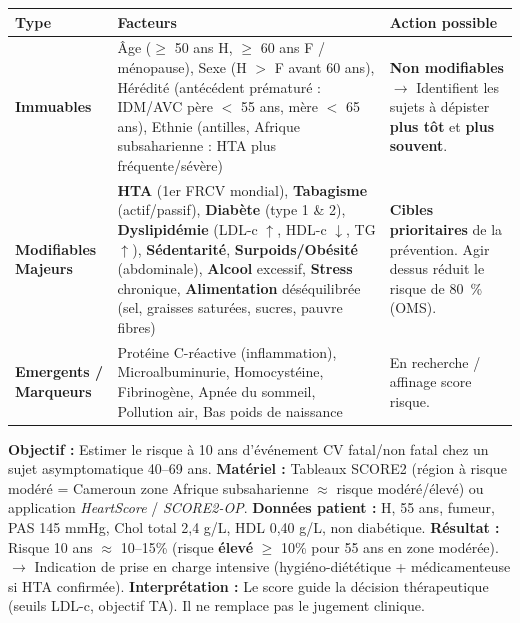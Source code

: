 \documentclass[11pt]{article}
\begin{document}
\begin{propriete}
\begin{center}
\begin{tabularx}{\linewidth}{|l|X|X|}\hline
\textbf{Type} & \textbf{Facteurs} & \textbf{Action possible} \\ \hline
\textbf{Immuables} & Âge ($\ge$ 50 ans H, $\ge$ 60 ans F / ménopause), Sexe (H $>$ F avant 60 ans), Hérédité (antécédent prématuré : IDM/AVC père $<$ 55 ans, mère $<$ 65 ans), Ethnie (antilles, Afrique subsaharienne : HTA plus fréquente/sévère) & \textbf{Non modifiables} $\rightarrow$ Identifient les sujets à dépister \textbf{plus tôt} et \textbf{plus souvent}. \\ \hline
\textbf{Modifiables \textbf{Majeurs}} & \textbf{HTA} (1er FRCV mondial), \textbf{Tabagisme} (actif/passif), \textbf{Diabète} (type 1 \& 2), \textbf{Dyslipidémie} (LDL-c $\uparrow$, HDL-c $\downarrow$, TG $\uparrow$), \textbf{Sédentarité}, \textbf{Surpoids/Obésité} (abdominale), \textbf{Alcool} excessif, \textbf{Stress} chronique, \textbf{Alimentation} déséquilibrée (sel, graisses saturées, sucres, pauvre fibres) & \textbf{Cibles prioritaires} de la prévention. Agir dessus r\'eduit le risque de 80~\% (OMS). \\ \hline
\textbf{Emergents / Marqueurs} & Protéine C-réactive (inflammation), Microalbuminurie, Homocystéine, Fibrinogène, Apnée du sommeil, Pollution air, Bas poids de naissance & En recherche / affinage score risque. \\ \hline
\end{tabularx}
\end{center}
\end{propriete}

\begin{experience}
\textbf{Objectif :} Estimer le risque à 10 ans d'événement CV fatal/non fatal chez un sujet asymptomatique 40--69 ans.
\textbf{Matériel :} Tableaux SCORE2 (région à risque modéré = Cameroun zone Afrique subsaharienne $\approx$ risque modéré/élevé) ou application \textit{HeartScore} / \textit{SCORE2-OP}.
\textbf{Données patient :} H, 55 ans, fumeur, PAS 145 mmHg, Chol total 2,4 g/L, HDL 0,40 g/L, non diabétique.
\textbf{Résultat :} Risque 10 ans $\approx$ 10--15\% (risque \textbf{élevé} $\ge$ 10\% pour 55 ans en zone modérée). $\rightarrow$ Indication de prise en charge intensive (hygiéno-diététique + médicamenteuse si HTA confirmée).
\textbf{Interprétation :} Le score guide la décision thérapeutique (seuils LDL-c, objectif TA). Il ne remplace pas le jugement clinique.
\end{experience}
\end{document}
